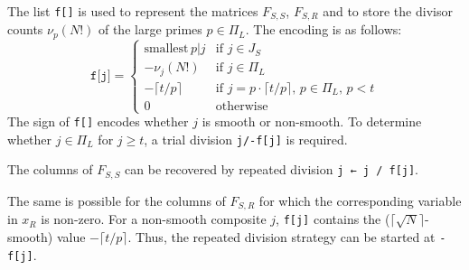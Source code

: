 \documentclass[12pt,a4paper,reqno]{amsart}
\numberwithin{equation}{section}
\begin{document}
The list \texttt{f[]} is used to represent the matrices $F_{S,S}$, $F_{S,R}$
and to store the divisor counts $\nu_p(N!)$ of the large primes $p \in \Pi_L$.
The encoding is as follows:
\begin{equation*}
  \texttt{f[j]} =
  \begin{cases}
    \text{smallest} \, p | j & \text{if } j \in J_S \\
    -\nu_j(N!)               & \text{if } j \in \Pi_L \\
    -\lceil t/p \rceil       & \text{if } j = p \cdot \lceil t/p \rceil \text{, } p \in \Pi_L \text{, } p < t \\
    0                        & \text{otherwise}
  \end{cases}
\end{equation*}
The sign of \texttt{f[]} encodes whether $j$ is smooth or non-smooth. To
determine whether $j \in \Pi_L$ for $j \geq t$, a trial division
\texttt{j/-f[j]} is required.

The columns of $F_{S,S}$ can be recovered by repeated division  
\texttt{j ← j / f[j]}.  

The same is possible for the columns of $F_{S,R}$ for which the corresponding
variable in $x_R$ is non-zero. For a non-smooth composite $j$, \texttt{f[j]}
contains the ($\lceil \sqrt{N} \rceil$-smooth) value $-\lceil t/p \rceil$.
Thus, the repeated division strategy can be started at \texttt{-f[j]}.
\end{document}
